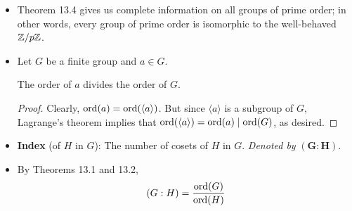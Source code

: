 \documentclass[../notes.tex]{subfiles}
\begin{document}
\begin{itemize}
\begin{theorem}
\begin{proof}
        \end{proof}
    \end{theorem}
    \item Theorem 13.4 gives us complete information on all groups of prime order; in other words, every group of prime order is isomorphic to the well-behaved $\mathbb{Z}/p\mathbb{Z}$.
    \item Let $G$ be a finite group and $a\in G$.
    \begin{theorem}
        The order of $a$ divides the order of $G$.
        \begin{proof}
            Clearly, $\operatorname{ord}(a)=\operatorname{ord}(\langle a\rangle)$. But since $\langle a\rangle$ is a subgroup of $G$, Lagrange's theorem implies that $\operatorname{ord}(\langle a\rangle)=\operatorname{ord}(a)\mid\operatorname{ord}(G)$, as desired.
        \end{proof}
    \end{theorem}
    \item \textbf{Index} (of $H$ in $G$): The number of cosets of $H$ in $G$. \emph{Denoted by} $\bm{(G:H)}$.
    \item By Theorems 13.1 and 13.2,
    \begin{equation*}
        (G:H) = \frac{\operatorname{ord}(G)}{\operatorname{ord}(H)}
    \end{equation*}
\end{itemize}
\end{document}
